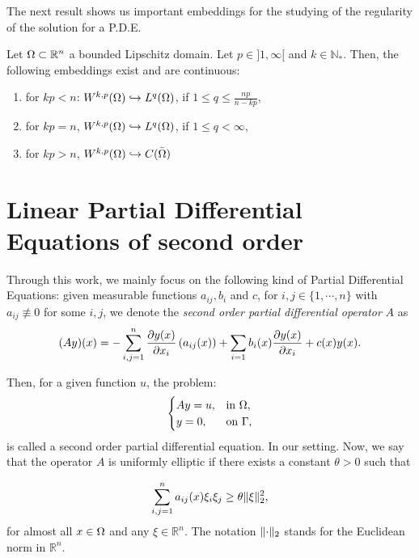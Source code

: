 The next result shows us important embeddings for the studying of the regularity of the solution for a P.D.E.

\begin{theorem} Let $\Omega\subset \mathbb{R}^n$ a bounded Lipschitz domain. Let $p\in ]1,\infty[$ and $k\in \mathbb{N}_{*}$. Then, the following embeddings exist and are continuous:
\begin{enumerate}
    \item for $kp<n$: $W^{k,p}(\Omega)\hookrightarrow L^q(\Omega)$, if $1\le q\le \frac{np}{n-kp}$,
    \item for $kp=n$, $W^{k,p}(\Omega)\hookrightarrow L^q(\Omega)$, if $1\le q<\infty$,
    \item for $kp>n$, $W^{k,p}(\Omega)\hookrightarrow C(\bar {\Omega})$
\end{enumerate}
    
\end{theorem}

\section{Linear Partial Differential Equations of second order}
Through this work, we mainly focus on the following kind of Partial Differential Equations: given measurable functions $a_{ij}, b_{i}$ and $c$, for $i,j\in \{1,\cdots, n\}$ with $a_{ij}\not\equiv 0$ for some $i,j$, we denote the \textit{second order partial differential operator} $A$ as
\begin{equation}\label{eq:operator_A}
    (Ay)(x)=-\sum_{i,j=1}^{n}\frac{\partial y(x)}{\partial x_i}\left(a_{ij}(x) \right)+\sum_{i=1}b_{i}(x)\frac{\partial y(x)}{\partial x_i}+c(x)y(x).
\end{equation}

Then, for a given function $u$, the problem:
\begin{equation}\label{eq:elliptic_pde}
\begin{cases}
    Ay=u, &\mbox{in }\Omega,\\
    y=0, &\mbox{on }\Gamma,
\end{cases}
\end{equation}
is called a second order partial differential equation. In our setting. Now, we say that the operator $A$ is uniformly elliptic if there exists a constant $\theta>0$ such that

\begin{equation}\label{eq:coercivity_A}
\sum_{i,j =1}^n a_{ij}(x)\xi_i\xi_j\ge \theta \lVert \xi \rVert_2^2,
\end{equation}
for almost all $x\in \Omega$ and any $\xi \in\mathbb{R}^n$. The notation $\lVert \cdot \rVert_2$ stands for the Euclidean norm in $\mathbb{R}^n$. 

